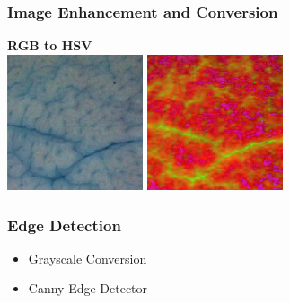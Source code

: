 \documentclass{beamer}
\begin{document}
\begin{frame}
	\frametitle{Image Enhancement and Conversion}
	\textbf{RGB to HSV}
	\\
	\includegraphics[width = 4cm]{before_3.png}
	\includegraphics[width = 4cm]{after_3.jpg}
\end{frame}

\begin{frame}
	\frametitle{Edge Detection}
	\begin{block}{}
		\begin{itemize}
			\item Grayscale Conversion
			\item Canny Edge Detector
		\end{itemize}
	\end{block}
\end{frame}
\end{document}
